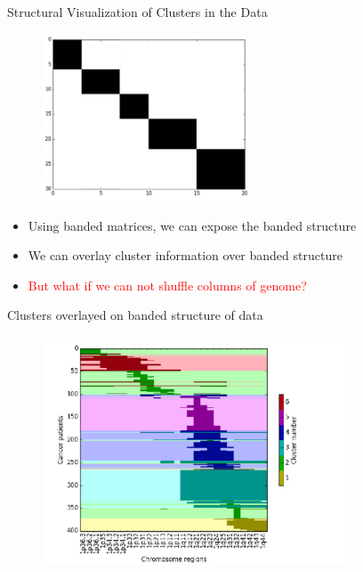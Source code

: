 \documentclass[first=dgreen,second=purple,logo=redexc]{aaltoslides}
\begin{document}
\begin{frame} {Structural Visualization of Clusters in the Data} 

      \begin{figure}
      \centering
      \includegraphics[trim=0cm 0cm 0cm 0cm, clip=true, width=0.55\textwidth]{figures/banded}
      \end{figure}
      
      \begin{itemize}\setlength{\itemsep}{1mm}
      
\small
\item Using banded matrices, we can expose the banded structure 
\item We can overlay cluster information over banded structure 
\pause \item \textcolor {red} { But what if we can not shuffle columns of genome?}
\end{itemize}

\end{frame}


\begin{frame} {Clusters overlayed on banded structure of data} 

      \begin{figure}
      \centering
      \includegraphics[trim=1cm 0cm 1cm 1cm, clip=true, width=0.8\textwidth]{figures/cluscolors}
      \end{figure}
      
      \vspace{-5mm}
      

\end{frame}
\end{document}
